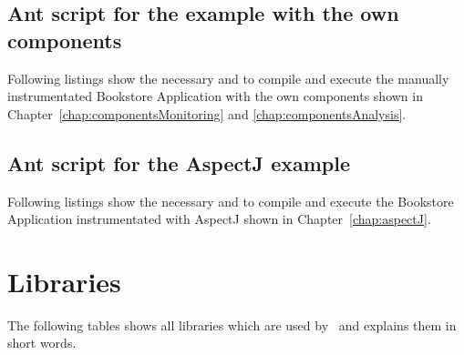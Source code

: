     \subsection{Ant script for the example with the own components}
      Following listings show the necessary  and  to compile and execute the manually instrumentated Bookstore Application with the own components shown in Chapter~\ref{chap:componentsMonitoring} and \ref{chap:componentsAnalysis}.
      \setXMLListing
      
      

    \subsection{Ant script for the AspectJ example}
      Following listings show the necessary  and  to compile and execute the Bookstore Application instrumentated with AspectJ shown in Chapter~\ref{chap:aspectJ}.
      \setXMLListing
      
           

\newpage
  \section{Libraries}
    The following tables shows all libraries which are used by \Kieker\ and explains them in short words.
    

